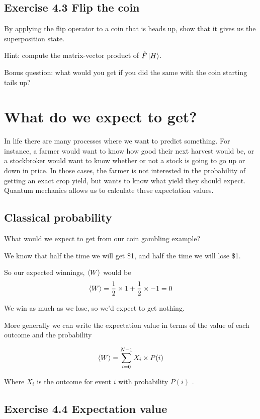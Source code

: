 \documentclass{book}
\begin{document}
\hline
\subsection{Exercise 4.3 Flip the coin}   

By applying the flip operator to a coin that is heads up, show that it gives us the superposition state.  

Hint: compute the matrix-vector product of $\hat{F}\ket{H}$.   
  
Bonus question: what would you get if you did the same with the coin starting tails up?  

\hline

\section{What do we expect to get?}

In life there are many processes where we want to predict something. For instance, a farmer would want to know how good their next harvest would be, or a stockbroker would want to know whether or not a stock is going to go up or down in price. In those cases, the farmer is not interested in the probability of getting an exact crop yield, but wants to know what yield they should expect. Quantum mechanics allows us to calculate these expectation values.

\subsection{ Classical probability }

What would we expect to get from our coin gambling example? 

We know that half the time we will get \$1, and half the time we will lose \$1. 

So our expected winnings, $\braket{W}$ would be
$$
\braket{W} = \frac{1}{2} \times 1 + \frac{1}{2} \times -1 
=0
$$

We win as much as we lose, so we'd expect to get nothing. 

More generally we can write the expectation value in terms of the value of each outcome and the probability 

$$ \braket{W} = \sum_{i = 0}^{N-1} X_i \times P(i) $$

Where $X_i$ is the outcome for event $i$ with probability $P(i)$ . 

\hline 
\subsection{Exercise 4.4 Expectation value}  
  
\end{document}
